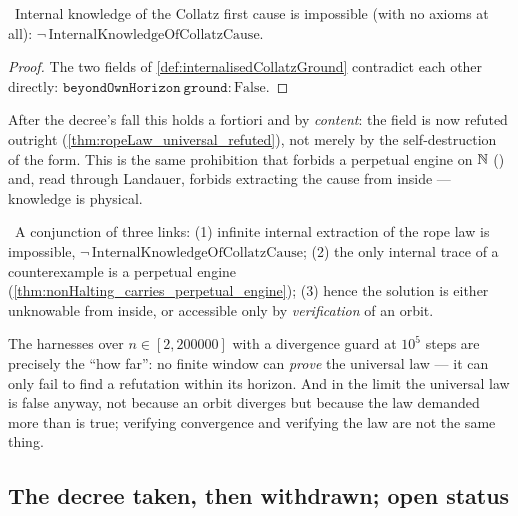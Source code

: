 \begin{theorem}\label{thm:collatzCause_unknowable}
\green{}\ Internal knowledge of the Collatz first cause is impossible (with no axioms at all):
$\neg\,\mathrm{InternalKnowledgeOfCollatzCause}$. 
\end{theorem}

\begin{proof}
The two fields of \cref{def:internalisedCollatzGround} contradict each other directly:
$\texttt{beyondOwnHorizon}\ \texttt{ground}:\mathrm{False}$.
\end{proof}

After the decree's fall this holds a fortiori and by \emph{content}: the field  is now
refuted outright (\cref{thm:ropeLaw_universal_refuted}), not merely by the self-destruction of the
form. This is the same prohibition that forbids a perpetual engine on $\mathbb{N}$
() and, read through Landauer, forbids extracting the cause from inside
--- knowledge is physical.

\begin{theorem}\label{thm:collatz_verification_not_derivation}
\green{}\ A conjunction of three links: (1) infinite internal extraction of the rope law is impossible,
$\neg\,\mathrm{InternalKnowledgeOfCollatzCause}$; (2) the only internal trace of a counterexample is a
perpetual engine (\cref{thm:nonHalting_carries_perpetual_engine}); (3) hence the solution is either
unknowable from inside, or accessible only by \emph{verification} of an orbit.
\end{theorem}

The harnesses over $n\in[2,200000]$ with a divergence guard at $10^5$ steps are precisely the ``how
far'': no finite window can \emph{prove} the universal law --- it can only fail to find a refutation
within its horizon. And in the limit the universal law is false anyway, not because an orbit diverges
but because the law demanded more than is true; verifying convergence and verifying the law are not
the same thing.

\subsection{The decree taken, then withdrawn; open status}

